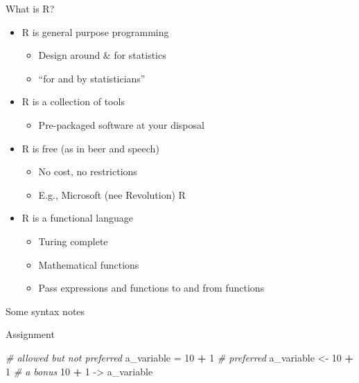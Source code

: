 \documentclass[
  ignorenonframetext,
]{beamer}
\newenvironment{Shaded}{\begin{snugshade}}{\end{snugshade}}
\newcommand{\CommentTok}[1]{\textcolor[rgb]{0.56,0.35,0.01}{\textit{#1}}}
\newcommand{\DecValTok}[1]{\textcolor[rgb]{0.00,0.00,0.81}{#1}}
\newcommand{\NormalTok}[1]{#1}
\newcommand{\OperatorTok}[1]{\textcolor[rgb]{0.81,0.36,0.00}{\textbf{#1}}}
\newcommand{\StringTok}[1]{\textcolor[rgb]{0.31,0.60,0.02}{#1}}
\providecommand{\tightlist}{%
  \setlength{\itemsep}{0pt}\setlength{\parskip}{0pt}}
\begin{document}
\begin{frame}{What is R?}
\protect\hypertarget{what-is-r}{}

\begin{itemize}
\tightlist
\item
  R is general purpose programming

  \begin{itemize}
  \tightlist
  \item
    Design around \& for statistics
  \item
    ``for and by statisticians''
  \end{itemize}
\item
  R is a collection of tools

  \begin{itemize}
  \tightlist
  \item
    Pre-packaged software at your disposal
  \end{itemize}
\item
  R is free (as in beer and speech)

  \begin{itemize}
  \tightlist
  \item
    No cost, no restrictions
  \item
    E.g., Microsoft (nee Revolution) R
  \end{itemize}
\item
  R is a functional language

  \begin{itemize}
  \tightlist
  \item
    Turing complete
  \item
    Mathematical functions
  \item
    Pass expressions and functions to and from functions
  \end{itemize}
\end{itemize}

\end{frame}

\begin{frame}{Some syntax notes}
\protect\hypertarget{some-syntax-notes}{}

\end{frame}

\begin{frame}[fragile]{Assignment}
\protect\hypertarget{assignment}{}

\begin{Shaded}
\begin{Highlighting}[]
\CommentTok{# allowed but not preferred}
\NormalTok{a_variable =}\StringTok{ }\DecValTok{10} \OperatorTok{+}\StringTok{ }\DecValTok{1}
\CommentTok{# preferred}
\NormalTok{a_variable <-}\StringTok{ }\DecValTok{10} \OperatorTok{+}\StringTok{ }\DecValTok{1}
\CommentTok{# a bonus}
\DecValTok{10} \OperatorTok{+}\StringTok{ }\DecValTok{1}\NormalTok{ ->}\StringTok{ }\NormalTok{a_variable}
\end{Highlighting}
\end{Shaded}

\end{frame}
\end{document}
